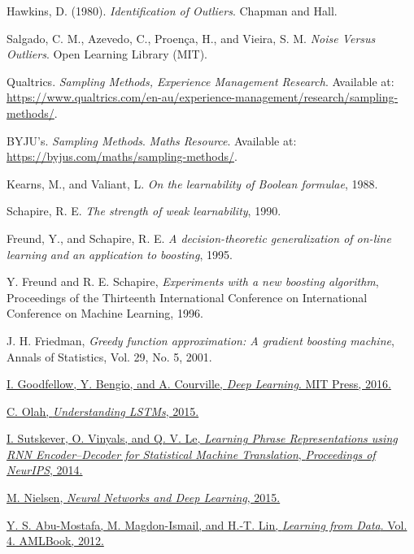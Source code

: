 \begin{thebibliography}{99}
     Hawkins, D. (1980). \textit{Identification of Outliers}. Chapman and Hall.
    
     Salgado, C. M., Azevedo, C., Proença, H., and Vieira, S. M. \textit{Noise Versus Outliers}. Open Learning Library (MIT).

     Qualtrics. \textit{Sampling Methods, Experience Management Research}. Available at: \url{https://www.qualtrics.com/en-au/experience-management/research/sampling-methods/}.
    
     BYJU's. \textit{Sampling Methods}. \textit{Maths Resource}. Available at: \url{https://byjus.com/maths/sampling-methods/}.

     Kearns, M., and Valiant, L. \textit{On the learnability of Boolean formulae}, 1988.
    
     Schapire, R. E. \textit{The strength of weak learnability}, 1990.
    
     Freund, Y., and Schapire, R. E. \textit{A decision-theoretic generalization of on-line learning and an application to boosting}, 1995.

     Y. Freund and R. E. Schapire, \textit{Experiments with a new boosting algorithm}, Proceedings of the Thirteenth International Conference on International Conference on Machine Learning, 1996.

     J. H. Friedman, \textit{Greedy function approximation: A gradient boosting machine}, Annals of Statistics, Vol. 29, No. 5, 2001.

    \href{http://www.deeplearningbook.org/}{I. Goodfellow, Y. Bengio, and A. Courville, \textit{Deep Learning}. MIT Press, 2016.}

    \href{https://colah.github.io/posts/2015-08-Understanding-LSTMs/}{C. Olah, \textit{Understanding LSTMs}, 2015.}

    \href{https://arxiv.org/abs/1406.1078}{I. Sutskever, O. Vinyals, and Q. V. Le, \textit{Learning Phrase Representations using RNN Encoder–Decoder for Statistical Machine Translation}, \textit{Proceedings of NeurIPS}, 2014.}

    \href{http://neuralnetworksanddeeplearning.com/}{M. Nielsen, \textit{Neural Networks and Deep Learning}, 2015.}

    \href{http://work.caltech.edu/telecourse.html}{Y. S. Abu-Mostafa, M. Magdon-Ismail, and H.-T. Lin, \textit{Learning from Data}. Vol. 4. AMLBook, 2012.}


\end{thebibliography}
